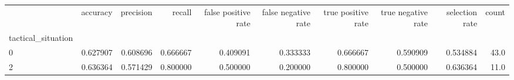 \begin{tabular}{lrrrrrrrrr}
\toprule
{} &  accuracy &  precision &    recall &  false positive rate &  false negative rate &  true positive rate &  true negative rate &  selection rate &  count \\
tactical\_situation &           &            &           &                      &                      &                     &                     &                 &        \\
\midrule
0                  &  0.627907 &   0.608696 &  0.666667 &             0.409091 &             0.333333 &            0.666667 &            0.590909 &        0.534884 &   43.0 \\
2                  &  0.636364 &   0.571429 &  0.800000 &             0.500000 &             0.200000 &            0.800000 &            0.500000 &        0.636364 &   11.0 \\
\bottomrule
\end{tabular}
